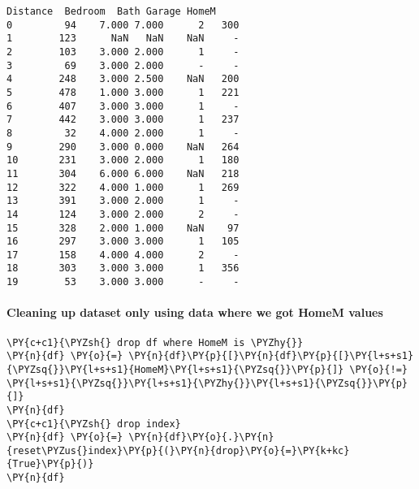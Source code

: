 \begin{tcolorbox}[breakable, size=fbox, boxrule=.5pt, pad at break*=1mm, opacityfill=0]
\begin{Verbatim}[commandchars=\\\{\}]
    Distance  Bedroom  Bath Garage HomeM
0         94    7.000 7.000      2   300
1        123      NaN   NaN    NaN     -
2        103    3.000 2.000      1     -
3         69    3.000 2.000      -     -
4        248    3.000 2.500    NaN   200
5        478    1.000 3.000      1   221
6        407    3.000 3.000      1     -
7        442    3.000 3.000      1   237
8         32    4.000 2.000      1     -
9        290    3.000 0.000    NaN   264
10       231    3.000 2.000      1   180
11       304    6.000 6.000    NaN   218
12       322    4.000 1.000      1   269
13       391    3.000 2.000      1     -
14       124    3.000 2.000      2     -
15       328    2.000 1.000    NaN    97
16       297    3.000 3.000      1   105
17       158    4.000 4.000      2     -
18       303    3.000 3.000      1   356
19        53    3.000 3.000      -     -
\end{Verbatim}
\end{tcolorbox}
        
    \hypertarget{cleaning-up-dataset-only-using-data-where-we-got-homem-values}{%
\paragraph{Cleaning up dataset only using data where we got HomeM
values}\label{cleaning-up-dataset-only-using-data-where-we-got-homem-values}}

    \begin{tcolorbox}[breakable, size=fbox, boxrule=1pt, pad at break*=1mm,colback=cellbackground, colframe=cellborder]
\begin{Verbatim}[commandchars=\\\{\}]
\PY{c+c1}{\PYZsh{} drop df where HomeM is \PYZhy{}}
\PY{n}{df} \PY{o}{=} \PY{n}{df}\PY{p}{[}\PY{n}{df}\PY{p}{[}\PY{l+s+s1}{\PYZsq{}}\PY{l+s+s1}{HomeM}\PY{l+s+s1}{\PYZsq{}}\PY{p}{]} \PY{o}{!=} \PY{l+s+s1}{\PYZsq{}}\PY{l+s+s1}{\PYZhy{}}\PY{l+s+s1}{\PYZsq{}}\PY{p}{]}
\PY{n}{df}
\PY{c+c1}{\PYZsh{} drop index}
\PY{n}{df} \PY{o}{=} \PY{n}{df}\PY{o}{.}\PY{n}{reset\PYZus{}index}\PY{p}{(}\PY{n}{drop}\PY{o}{=}\PY{k+kc}{True}\PY{p}{)}
\PY{n}{df}
\end{Verbatim}
\end{tcolorbox}

